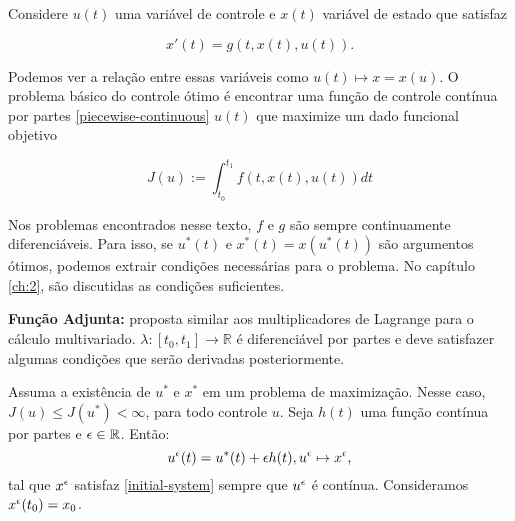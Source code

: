 Considere $u(t)$ uma variável de controle e $x(t)$ variável de estado que
satisfaz 

\begin{equation}
    \label{initial-system}
    x'(t) = g(t,x(t),u(t)). 
\end{equation}

Podemos ver a relação entre essas variáveis
como $u(t) \mapsto x = x(u)$.  O problema básico do controle ótimo é encontrar
uma função de controle contínua por partes \ref{piecewise-continuous} $u(t)$ que
maximize um dado funcional objetivo 

\begin{equation}
    \label{objetivo}
    J(u) := \int_{t_0}^{t_1} f(t,x(t),u(t))dt    
\end{equation}

Nos problemas encontrados nesse texto, $f$ e $g$ são sempre continuamente
diferenciáveis. Para isso, se $u^{*}(t)$ e $x^*(t) = x(u^*(t))$ são
argumentos ótimos, podemos extrair condições necessárias para o problema. No
capítulo \ref{ch:2}, são discutidas as condições suficientes. 

\label{adjoint-function}
\textbf{Função Adjunta:} proposta similar aos multiplicadores de Lagrange para
o cálculo multivariado. $\lambda : [t_0,t_1] \to \mathbb{R}$ é diferenciável
por partes e deve satisfazer algumas condições que serão derivadas
posteriormente. 

Assuma a existência de $u^*$ e $x^*$ em um problema de maximização. Nesse caso, $J(u) \leq J(u^*)
< \infty$, para todo controle $u$. Seja $h(t)$ uma função contínua por partes
e $\epsilon \in \mathbb{R}$.  Então:
\begin{equation*}
    u^{\epsilon}(t) = u^*(t) + \epsilon h(t), u^{\epsilon} \mapsto x^{\epsilon}, 
\end{equation*}
tal que $x^{\epsilon}$ satisfaz \ref{initial-system} sempre que $u^{\epsilon}$ é contínua. Consideramos $x^{\epsilon}(t_0) = x_0$.

